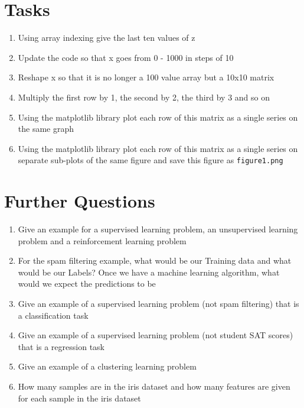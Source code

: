 \documentclass[12pt]{article}
\def\code#1{\texttt{#1}} %
\begin{document}
\section{Tasks}
\begin{enumerate}
\item Using array indexing give the last ten values of z
\item Update the code so that x goes from 0 - 1000 in steps of 10
\item Reshape x so that it is no longer a 100 value array but a 10x10 matrix
\item Multiply the first row by 1, the second by 2, the third by 3 and so on 
\item Using the matplotlib library plot each row of this matrix as a single series on the same graph
\item Using the matplotlib library plot each row of this matrix as a single series on separate sub-plots of the same figure and save this figure as \code{figure1.png}
\end{enumerate}

%
%
%
%
%
%

\section{Further Questions}
\begin{enumerate}
\item Give an example for a supervised learning problem, an unsupervised learning problem and a reinforcement learning problem
\item For the spam filtering example, what would be our Training data and what would be our Labels? Once we have a machine learning algorithm, what would we expect the predictions to be
\item Give an example of a supervised learning problem (not spam filtering) that is a classification task
\item Give an example of a supervised learning problem (not student SAT scores) that is a regression task
\item Give an example of a clustering learning problem 
\item How many samples are in the iris dataset and how many features are given for each sample in the iris dataset

\end{enumerate}
\end{document}
